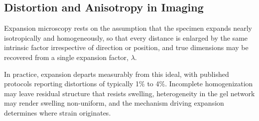 \documentclass[%
 reprint,
 11pt,
 amsmath,amssymb,
 aps,
]{revtex4-2}
\begin{document}
\subsection{Distortion and Anisotropy in Imaging}

Expansion microscopy rests on the assumption that the specimen expands nearly isotropically and homogeneously, so that every distance is enlarged by the same intrinsic factor irrespective of direction or position, and true dimensions may be recovered from a single expansion factor, $\lambda$.\cite{exm,jcs}

In practice, expansion departs measurably from this ideal, with published protocols reporting distortions of typically 1\% to 4\%.\cite{exm,proexm,magnify} Incomplete homogenization may leave residual structure that resists swelling,\cite{gao,magnify} heterogeneity in the gel network may render swelling non-uniform,\cite{gelmap} and the mechanism driving expansion determines where strain originates.\cite{texm}
\end{document}
